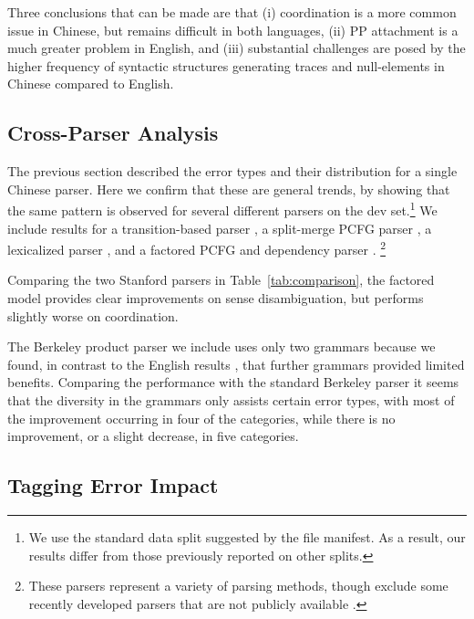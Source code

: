 Three conclusions that can be made are that (i) coordination is a more common issue in Chinese, but remains difficult in
both languages, (ii) PP attachment is a much greater problem in English, and
(iii) substantial challenges are posed by the higher frequency of
syntactic structures generating traces and null-elements in Chinese compared to English.

\subsection{Cross-Parser Analysis} \label{sec:cross_parser_analysis}

The previous section described the error types and their distribution for a single Chinese parser.
Here we confirm that these are general trends, by showing that the same pattern
is observed for several different parsers on the  dev set.\footnote{
  We use the standard data split suggested by the  file manifest.
  As a result, our results differ from those previously reported on other splits.
}
We include results for
a transition-based parser \parencite[ZPAR;][]{Zhang-Clark:2009:ICPT},
a split-merge PCFG parser \parencite{Petrov-etal:2006,Petrov-Klein:2007,Petrov:2010:NAACLHLT},
a lexicalized parser \parencite{Bikel-Chiang:2000:CLP},
and a factored PCFG and dependency parser
\parencite{Levy-Manning:2003:ACL,Klein-Manning:2003:ACL,Klein-Manning:2003:NIPS}.
\footnote{These parsers represent a variety of parsing methods, though exclude
some recently developed parsers that are not publicly
available \parencite{Qian-Liu:2012:EMNLP,Xiong-etal:2005:IJCNLP}.}

Comparing the two Stanford parsers in Table~\ref{tab:comparison}, the factored
model provides clear improvements on sense disambiguation, but performs
slightly worse on coordination.

The Berkeley product parser we include uses only two grammars because we found,
in contrast to the English results \parencite{Petrov:2010:NAACLHLT}, that further
grammars provided limited benefits.  Comparing the performance with the
standard Berkeley parser it seems that the diversity in the grammars only
assists certain error types, with most of the improvement occurring in four of
the categories, while there is no improvement, or a slight decrease, in five categories.

\subsection{Tagging Error Impact} \label{sec:pos_ablation_study}

